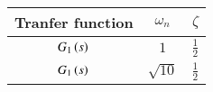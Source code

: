 \begin{tabular}{|c|c|c|}
	\hline
	\textbf{Tranfer function} &  $\omega_{n}$ & $\zeta$\\[6pt]
	\hline
	$G_{1}\left(s\right)$ & $1$ & $\frac{1}{2}$ \\[6pt]
	\hline
	$G_{1}\left(s\right)$ & $\sqrt{10}$ & $\frac{1}{2}$ \\[6pt]
	\hline
\end{tabular}
